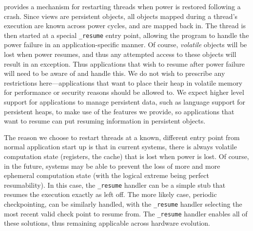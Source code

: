 {    \Twizzler provides a mechanism for restarting threads when power is restored following a crash.
    Since views are persistent objects, all objects mapped during a thread's execution are known across
    power cycles, and are mapped back in. The thread is then started at a special \texttt{\_resume}
    entry point, allowing the program to handle the power failure in an application-specific manner.  Of
    course, \emph{volatile} objects will be lost when power resumes, and thus any attempted access to
    these objects will result in an exception. Thus applications that wish to resume after power failure
    will need to be aware of and handle this. We do not wish to prescribe any restrictions
    here---applications that want to place their heap in volatile memory for performance or security
    reasons should be allowed to. We expect higher level support for applications to manage persistent
    data, such as language support for persistent heaps, to make use of the features we provide, so
    applications that want to resume can put resuming information in persistent objects.

    The reason we choose to restart threads at a known, different entry point from normal application
    start up is that in current systems, there is always volatile computation state (\eg registers, the
    cache) that is lost when power is lost. Of course, in the future, systems may be able to prevent the
    loss of more and more ephemeral computation state (with the logical extreme being perfect
    resumability). In this case, the \texttt{\_resume} handler can be a simple stub that resumes the
    execution exactly as left off. The more likely case, periodic checkpointing, can be similarly
    handled, with the \texttt{\_resume} handler selecting the most recent valid check point to resume
    from. The \texttt{\_resume} handler enables all of these solutions, thus remaining applicable across
    hardware evolution.

}